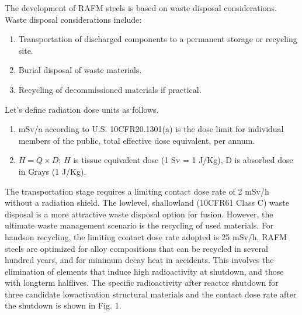\documentclass[letterpaper,10pt,english]{jupyterBook}
\begin{document}
	\sphinxAtStartPar
	The development of RAFM steels is based on waste disposal considerations. Waste disposal considerations include:
	\begin{enumerate}
		\item {} 
		\sphinxAtStartPar
		Transportation of discharged components to a permanent storage or recycling site.
		
		\item {} 
		\sphinxAtStartPar
		Burial disposal of waste materials.
		
		\item {} 
		\sphinxAtStartPar
		Recycling of decommissioned materials if practical.
		
	\end{enumerate}
	
	\sphinxAtStartPar
	Let’s define radiation dose units as follows.
	\begin{enumerate}
		\item {} 
		 mSv/a according to U.S. 10CFR\sphinxhyphen{}20.1301(a) is the dose limit for individual members of the public, total effective dose equivalent, per annum.
		
		\item {} 
		\sphinxAtStartPar
		\(H = Q \times D\); \(H\) is tissue equivalent dose (1 Sv = 1 J/Kg), D is absorbed dose in Grays (1 J/Kg).
		
	\end{enumerate}
	
	\sphinxAtStartPar
	The transportation stage requires a limiting contact dose rate of 2 mSv/h without a radiation shield. The low\sphinxhyphen{}level, shallow\sphinxhyphen{}land (10CFR61 Class C) waste disposal is a more attractive waste disposal option for fusion. However, the ultimate waste management scenario is the recycling of used materials. For hands\sphinxhyphen{}on recycling, the limiting contact dose rate adopted is 25 mSv/h. RAFM steels are optimized for alloy compositions that can be recycled in several hundred years, and for minimum decay heat in accidents. This involves the elimination of elements that induce high radioactivity at shutdown, and those with long\sphinxhyphen{}term half\sphinxhyphen{}lives. The specific radioactivity after reactor shutdown for three candidate low\sphinxhyphen{}activation structural materials and the contact dose rate after the shutdown is shown in Fig. 1.
	
\end{document}
